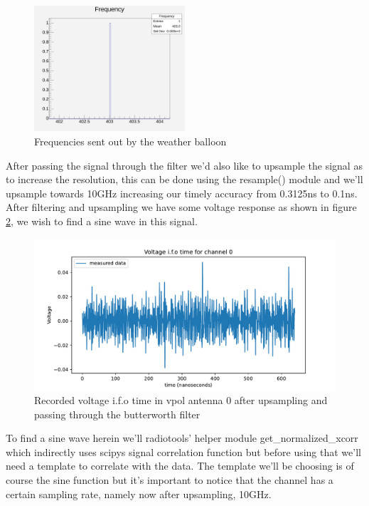 \documentclass[11pt,a4paper,faculty=we,language=en,doctype=report]{cls/ugent-doc}
\begin{document}
\begin{figure}
  \centering
  \includegraphics[width=0.5\textwidth]{Frequencies.pdf}
  \caption{Frequencies sent out by the weather balloon}
  \label{fig:BalloonFreq}
\end{figure}
After passing the signal through the filter we'd also like to upsample the
signal as to increase the resolution, this can be done using the resample()
module and we'll upsample towards 10GHz increasing our timely accuracy from
0.3125ns to 0.1ns.  After filtering and upsampling we have some voltage
response as shown in figure \ref{fig:VoltageAfterFilter}, we wish to find a
sine wave in this signal.

\begin{figure}
	\centering
	\includegraphics[width=\textwidth]{figures/VoltageAfterFilter.pdf}
	\caption{Recorded voltage i.f.o time in vpol antenna 0 after upsampling and passing through the butterworth filter}
	\label{fig:VoltageAfterFilter}
\end{figure}

To find a sine wave herein we'll radiotools' helper module get\_normalized\_xcorr
which indirectly uses scipys signal correlation function but before using that we'll
need a template to correlate with the data. The template we'll be choosing is
of course the sine function but it's important to notice that the channel has a
certain sampling rate, namely now after upsampling, 10GHz. 
\end{document}
